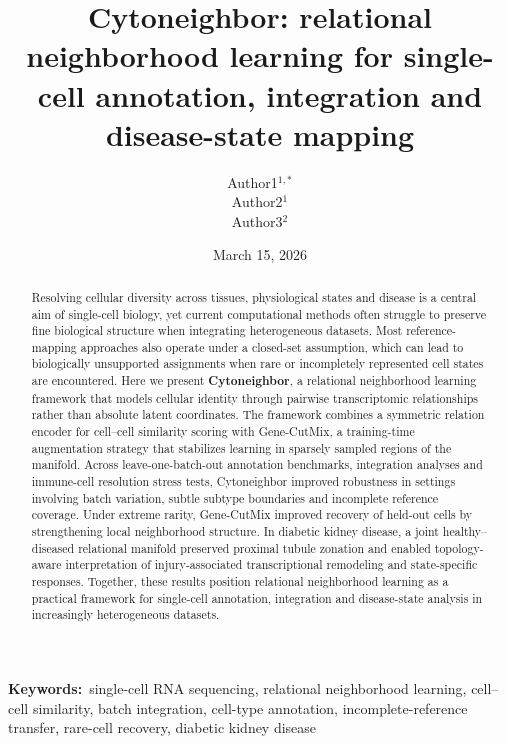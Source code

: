 \documentclass[11pt]{article}
\newcommand{\keywords}[1]{\par\vspace{6pt}
  \noindent\textbf{Keywords:}\ #1\par
}
\begin{document}
\title{Cytoneighbor: relational neighborhood learning for single-cell annotation, integration and disease-state mapping}

\author{Author1$^{1, \ast}$\\
    Author2$^{1}$ \\
    Author3$^{2}$
}
\date{March 15, 2026}

\maketitle

\begin{abstract}
Resolving cellular diversity across tissues, physiological states and disease is a central aim of single-cell biology, yet current computational methods often struggle to preserve fine biological structure when integrating heterogeneous datasets. Most reference-mapping approaches also operate under a closed-set assumption, which can lead to biologically unsupported assignments when rare or incompletely represented cell states are encountered. Here we present \textbf{Cytoneighbor}, a relational neighborhood learning framework that models cellular identity through pairwise transcriptomic relationships rather than absolute latent coordinates. The framework combines a symmetric relation encoder for cell--cell similarity scoring with Gene-CutMix, a training-time augmentation strategy that stabilizes learning in sparsely sampled regions of the manifold. Across leave-one-batch-out annotation benchmarks, integration analyses and immune-cell resolution stress tests, Cytoneighbor improved robustness in settings involving batch variation, subtle subtype boundaries and incomplete reference coverage. Under extreme rarity, Gene-CutMix improved recovery of held-out cells by strengthening local neighborhood structure. In diabetic kidney disease, a joint healthy--diseased relational manifold preserved proximal tubule zonation and enabled topology-aware interpretation of injury-associated transcriptional remodeling and state-specific responses. Together, these results position relational neighborhood learning as a practical framework for single-cell annotation, integration and disease-state analysis in increasingly heterogeneous datasets.
\end{abstract}


\keywords{single-cell RNA sequencing, relational neighborhood learning, cell--cell similarity, batch integration, cell-type annotation, incomplete-reference transfer, rare-cell recovery, diabetic kidney disease}
\end{document}
